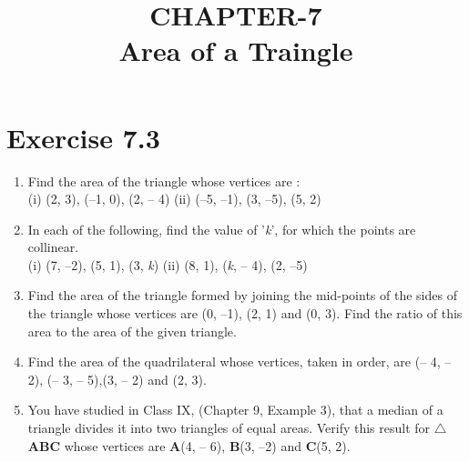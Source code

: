 \documentclass[12pt]{article}
\begin{document}
\begin{center}
\title{\textbf{CHAPTER-7} \\Area of a Traingle}
\date{\vspace{-5ex}} %
\maketitle
\end{center}

\section*{Exercise 7.3} %
\begin{enumerate}

\item Find the area of the triangle whose vertices are : \\
(i) (2, 3), (–1, 0), (2, – 4) \hspace{8mm}      (ii) (–5, –1), (3, –5), (5, 2) 

\vspace{3mm}

\item In each of the following, find the value of '\textit{k}', for which the points are collinear. \\
(i) (7, –2), (5, 1), (3, \textit{k})   \hspace{10mm}       (ii) (8, 1), (\textit{k}, – 4), (2, –5) 

\vspace{3mm}

\item Find the area of the triangle formed by joining the mid-points of the sides of the triangle whose vertices are (0, –1), (2, 1) and (0, 3). Find the ratio of this area to the area of the given triangle.
\vspace{3mm}

\item Find the area of the quadrilateral whose vertices, taken in order, are (– 4, – 2), (– 3, – 5),(3, – 2) and (2, 3).

\vspace{3mm}

\item You have studied in Class IX, (Chapter 9, Example 3), that a median of a triangle divides it into two triangles of equal areas. Verify this result for $\triangle$\textbf{ABC} whose vertices are \textbf{A}(4, – 6), \textbf{B}(3, –2) and \textbf{C}(5, 2). 

\end{enumerate}
\end{document}
